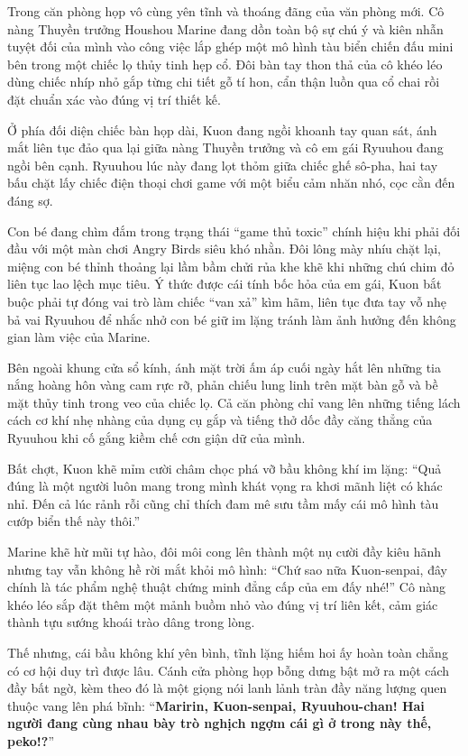 \documentclass[../main.tex]{subfiles}
\begin{document}
Trong căn phòng họp vô cùng yên tĩnh và thoáng đãng của văn phòng mới. Cô nàng Thuyền trưởng Houshou Marine đang dồn toàn bộ sự chú ý và kiên nhẫn tuyệt đối của mình vào công việc lắp ghép một mô hình tàu biển chiến đấu mini bên trong một chiếc lọ thủy tinh hẹp cổ. Đôi bàn tay thon thả của cô khéo léo dùng chiếc nhíp nhỏ gắp từng chi tiết gỗ tí hon, cẩn thận luồn qua cổ chai rồi đặt chuẩn xác vào đúng vị trí thiết kế.

Ở phía đối diện chiếc bàn họp dài, Kuon đang ngồi khoanh tay quan sát, ánh mắt liên tục đảo qua lại giữa nàng Thuyền trưởng và cô em gái Ryuuhou đang ngồi bên cạnh. Ryuuhou lúc này đang lọt thỏm giữa chiếc ghế sô-pha, hai tay bấu chặt lấy chiếc điện thoại chơi game với một biểu cảm nhăn nhó, cọc cằn đến đáng sợ.

Con bé đang chìm đắm trong trạng thái ``game thủ toxic'' chính hiệu khi phải đối đầu với một màn chơi Angry Birds siêu khó nhằn. Đôi lông mày nhíu chặt lại, miệng con bé thỉnh thoảng lại lầm bầm chửi rủa khe khẽ khi những chú chim đỏ liên tục lao lệch mục tiêu. Ý thức được cái tính bốc hỏa của em gái, Kuon bắt buộc phải tự đóng vai trò làm chiếc ``van xả'' kìm hãm, liên tục đưa tay vỗ nhẹ bả vai Ryuuhou để nhắc nhở con bé giữ im lặng tránh làm ảnh hưởng đến không gian làm việc của Marine.

Bên ngoài khung cửa sổ kính, ánh mặt trời ấm áp cuối ngày hắt lên những tia nắng hoàng hôn vàng cam rực rỡ, phản chiếu lung linh trên mặt bàn gỗ và bề mặt thủy tinh trong veo của chiếc lọ. Cả căn phòng chỉ vang lên những tiếng lách cách cơ khí nhẹ nhàng của dụng cụ gắp và tiếng thở dốc đầy căng thẳng của Ryuuhou khi cố gắng kiềm chế cơn giận dữ của mình.

Bất chợt, Kuon khẽ mỉm cười châm chọc phá vỡ bầu không khí im lặng: ``Quả đúng là một người luôn mang trong mình khát vọng ra khơi mãnh liệt có khác nhỉ. Đến cả lúc rảnh rỗi cũng chỉ thích đam mê sưu tầm mấy cái mô hình tàu cướp biển thế này thôi.''

Marine khẽ hừ mũi tự hào, đôi môi cong lên thành một nụ cười đầy kiêu hãnh nhưng tay vẫn không hề rời mắt khỏi mô hình: ``Chứ sao nữa Kuon-senpai, đây chính là tác phẩm nghệ thuật chứng minh đẳng cấp của em đấy nhé!'' Cô nàng khéo léo sắp đặt thêm một mảnh buồm nhỏ vào đúng vị trí liên kết, cảm giác thành tựu sướng khoái trào dâng trong lòng.

Thế nhưng, cái bầu không khí yên bình, tĩnh lặng hiếm hoi ấy hoàn toàn chẳng có cơ hội duy trì được lâu. Cánh cửa phòng họp bỗng dưng bật mở ra một cách đầy bất ngờ, kèm theo đó là một giọng nói lanh lảnh tràn đầy năng lượng quen thuộc vang lên phá bĩnh: ``\textbf{Maririn, Kuon-senpai, Ryuuhou-chan! Hai người đang cùng nhau bày trò nghịch ngợm cái gì ở trong này thế, peko!?}''
\end{document}
